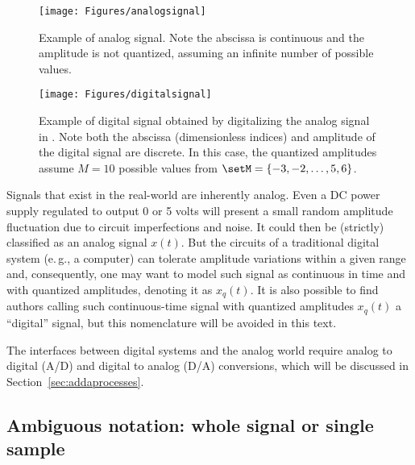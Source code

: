 \begin{figure}
	\centering
		\texttt{[image: Figures/analogsignal]}		
	\caption{Example of analog signal. Note the abscissa is continuous and the amplitude is not quantized, assuming an infinite number of possible values.\label{fig:analogsignal}}
\end{figure}

\begin{figure}
	\centering
		\texttt{[image: Figures/digitalsignal]}
		\caption[Example of digital signal obtained by digitalizing the analog signal in ]{Example of digital signal obtained by digitalizing the analog signal in . Note both the abscissa (dimensionless indices) and amplitude of the digital signal are discrete. In this case, the quantized amplitudes assume $M=10$ possible values from $\setM=\{-3,-2,\ldots,5,6\}$.\label{fig:digitalsignal}}
\end{figure}

Signals that exist in the real-world are inherently analog.
Even a DC power supply regulated to output 0 or 5 volts will present a small random amplitude fluctuation due to circuit imperfections and noise. It could then be (strictly) classified as an analog signal $x(t)$. 
But the circuits of a traditional digital system (e.\,g., a computer) can tolerate amplitude variations within a given range and, consequently, one may want to model such signal as continuous in time and with quantized amplitudes, denoting it as $x_q(t)$. It is also possible to find authors calling such continuous-time signal with quantized amplitudes $x_q(t)$ a ``digital'' signal, but this nomenclature will be avoided in this text. 

The interfaces between digital systems and the analog world require analog to digital (A/D) and digital to analog (D/A) conversions, which will be discussed in Section~\ref{sec:addaprocesses}.


\subsection{{\akadvanced} Ambiguous notation: whole signal or single sample}
\label{sec:signal_notation}

